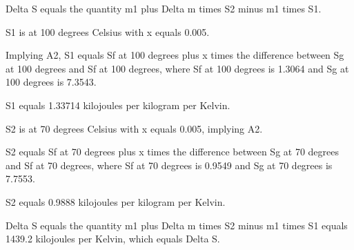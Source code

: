 Delta S equals the quantity m1 plus Delta m times S2 minus m1 times S1.

S1 is at 100 degrees Celsius with x equals 0.005.

Implying A2, S1 equals Sf at 100 degrees plus x times the difference between Sg at 100 degrees and Sf at 100 degrees, where Sf at 100 degrees is 1.3064 and Sg at 100 degrees is 7.3543.

S1 equals 1.33714 kilojoules per kilogram per Kelvin.

S2 is at 70 degrees Celsius with x equals 0.005, implying A2.

S2 equals Sf at 70 degrees plus x times the difference between Sg at 70 degrees and Sf at 70 degrees, where Sf at 70 degrees is 0.9549 and Sg at 70 degrees is 7.7553.

S2 equals 0.9888 kilojoules per kilogram per Kelvin.

Delta S equals the quantity m1 plus Delta m times S2 minus m1 times S1 equals 1439.2 kilojoules per Kelvin, which equals Delta S.
